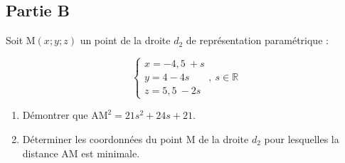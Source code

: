 \documentclass[10pt]{article}
\providecommand{\R}{\mathbb{R}}
\providecommand{\np}[2][]{{#2~#1}}
\begin{document}
\subsection*{Partie B}


Soit M$(x ; y ; z)$ un point de la droite $d_2$ de représentation paramétrique :

$$\begin{cases}x=\np{-4,5} +s \\
	y=4-4s \\
	z=\np{5,5}-2s \end{cases},\: s \in \R$$

\begin{enumerate}
	\item Démontrer que $\mathrm{AM}^2 = 21s^2 + 24s + 21$.

	\item Déterminer les coordonnées du point M de la droite $d_2$ pour lesquelles la distance AM est minimale.
\end{enumerate}
\end{document}
